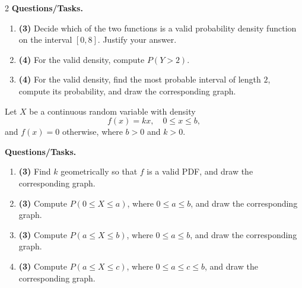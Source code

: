 \begin{multicols}{2}
		\textbf{Questions/Tasks.}
		\begin{enumerate}[label=(\alph*)]
			\item \textbf{(3)} Decide which of the two functions is a valid probability density function on the interval $[0,8]$. Justify your answer.
			\item \textbf{(4)} For the valid density, compute $P(Y>2)$.
			\item \textbf{(4)} For the valid density, find the most probable interval of length $2$, compute its probability, and draw the corresponding graph.
		\end{enumerate}
		
		\vspace{0.25cm}
		\vspace{-0.3cm}
		Let $X$ be a continuous random variable with density
		\[
		f(x)=kx,\quad 0\le x\le b,
		\]
		and $f(x)=0$ otherwise, where $b>0$ and $k>0$.
		
		\textbf{Questions/Tasks.}
		\begin{enumerate}[label=(\alph*)]
			\item \textbf{(3)} Find $k$ geometrically so that $f$ is a valid PDF, and draw the corresponding graph.
			\item \textbf{(3)} Compute $P(0\le X\le a)$, where $0\le a\le b$, and draw the corresponding graph.
			\item \textbf{(3)} Compute $P(a\le X\le b)$, where $0\le a\le b$, and draw the corresponding graph.
			\item \textbf{(3)} Compute $P(a\le X\le c)$, where $0\le a\le c\le b$, and draw the corresponding graph.
		\end{enumerate}
		
	\end{multicols}
	
